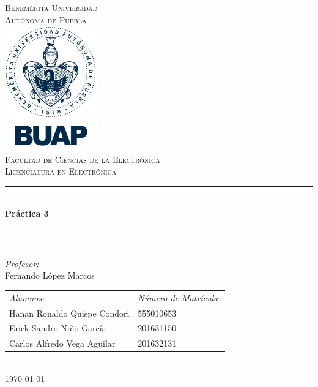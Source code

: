 \documentclass[12pt]{article}
\date{\today}
\begin{document}
\begin{titlepage}
\newcommand{\HRule}{\rule{\linewidth}{0.5mm}} 
\center
\textsc{\LARGE  Benemérita Universidad \\[0.2cm] Autónoma de Puebla}\\[1.5cm] 
\includegraphics[width=4cm]{escudo.jpg}\\[1cm]
\textsc{\Large Facultad de Ciencias de la Electrónica}\\[0.5cm] 
\textsc{\large Licenciatura en Electrónica}\\[0.5cm]
\HRule \\[0.4cm]
{ \huge \bfseries Práctica 3}\\[0.4cm] 
\HRule \\[1.5cm]
\begin{minipage}{\textwidth}
\center 

\emph{Profesor:} \\
Fernando López Marcos \\[1cm]

\begin{tabular}{ll}
\emph{Alumnos:} & \emph{Número de Matrícula:}\\
Hanan Ronaldo Quispe Condori  & 555010653 \\
Erick Sandro Niño García & 201631150\\
Carlos Alfredo Vega Aguilar & 201632131 \\
\end{tabular}
\end{minipage}\\[2cm]
\today
\end{titlepage}



\end{document}
